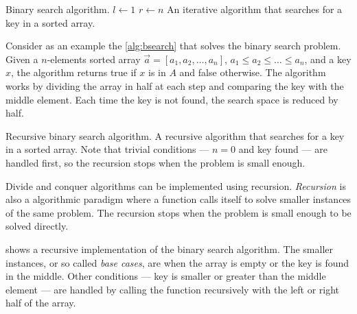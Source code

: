 \begin{algobox}[label=alg:bsearch]{Binary search algorithm.}
  $l \gets 1$\;
  $r \gets n$\;
  \tcblower
  An iterative algorithm that searches for a key in a sorted array.
\end{algobox}

Consider as an example the \cref{alg:bsearch} that solves the binary search problem.  Given a
$n$-elements sorted array $\vec{a} = \left[a_1, a_2, \dots, a_n\right]$, $a_1 \leq a_2 \leq
\dots \leq a_n$, and a key $x$, the algorithm returns true if $x$ is in $A$ and false
otherwise.  The algorithm works by dividing the array in half at each step and comparing
the key with the middle element.  Each time the key is not found, the search space is
reduced by half.

\begin{algobox}[label=alg:bsearch2]{Recursive binary search algorithm.}
  \tcblower
  A recursive algorithm that searches for a key in a sorted array.  Note that trivial
  conditions --- $n = 0$ and key found --- are handled first, so the recursion stops
  when the problem is small enough.
\end{algobox}

Divide and conquer algorithms can be implemented using recursion.  \emph{Recursion}
is also a algorithmic paradigm where a function calls itself to solve smaller instances of the
same problem.  The recursion stops when the problem is small enough to be solved directly.

 shows a recursive implementation of the binary search algorithm.
The smaller instances, or so called \emph{base cases}, are when the array is empty or the key
is found in the middle.  Other conditions --- key is smaller or greater than the middle element ---
are handled by calling the function recursively with the left or right half of the array.

